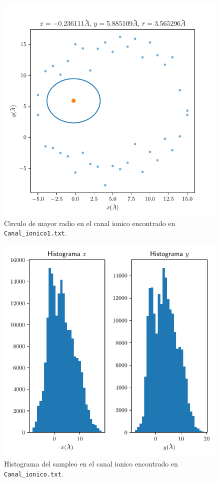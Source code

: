 \documentclass[a4paper]{article}
\begin{document}
	\begin{figure}
		\includegraphics{canal_ionico_2.pdf}
		\caption{Circulo de mayor radio en el canal ionico encontrado en \texttt{Canal\_ionico1.txt}.}
		\label{fig:canal1}	
	\end{figure}

	\begin{figure}
		\includegraphics{histograma_1.pdf}
		\caption{Histograma del sampleo en el canal ionico encontrado en \texttt{Canal\_ionico.txt}.}
		\label{fig:hist}
	\end{figure}
\end{document}
